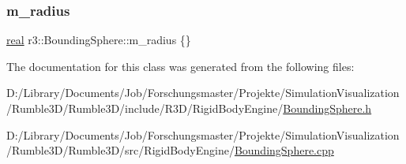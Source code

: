 \subsubsection{\texorpdfstring{m\+\_\+radius}{m\_radius}}
{\footnotesize\ttfamily \mbox{\hyperlink{namespacer3_ab2016b3e3f743fb735afce242f0dc1eb}{real}} r3\+::\+Bounding\+Sphere\+::m\+\_\+radius \{\}\hspace{0.3cm}{\ttfamily [protected]}}



The documentation for this class was generated from the following files\+:\begin{DoxyCompactItemize}
\item 
D\+:/\+Library/\+Documents/\+Job/\+Forschungsmaster/\+Projekte/\+Simulation\+Visualization/\+Rumble3\+D/\+Rumble3\+D/include/\+R3\+D/\+Rigid\+Body\+Engine/\mbox{\hyperlink{_bounding_sphere_8h}{Bounding\+Sphere.\+h}}\item 
D\+:/\+Library/\+Documents/\+Job/\+Forschungsmaster/\+Projekte/\+Simulation\+Visualization/\+Rumble3\+D/\+Rumble3\+D/src/\+Rigid\+Body\+Engine/\mbox{\hyperlink{_bounding_sphere_8cpp}{Bounding\+Sphere.\+cpp}}\end{DoxyCompactItemize}
